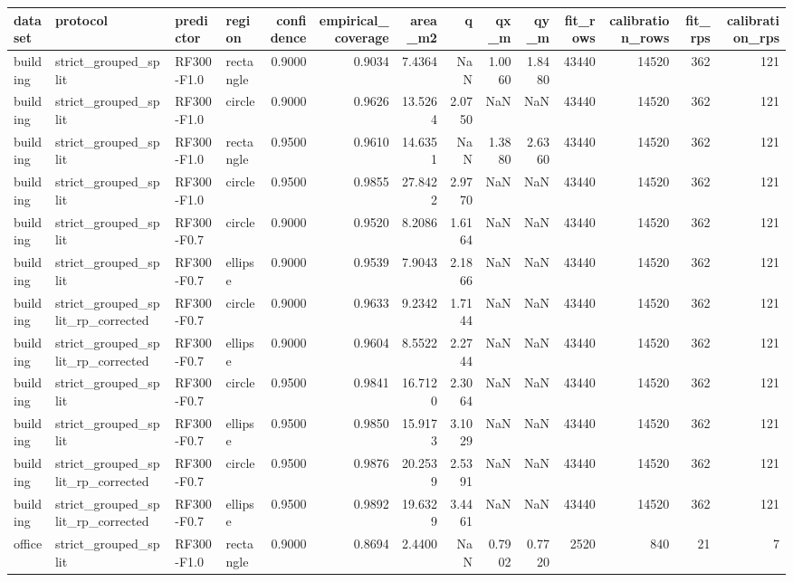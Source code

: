 \begin{tabular}{llllrrrrrrrrrr}
\toprule
dataset & protocol & predictor & region & confidence & empirical\_coverage & area\_m2 & q & qx\_m & qy\_m & fit\_rows & calibration\_rows & fit\_rps & calibration\_rps \\
\midrule
building & strict\_grouped\_split & RF300-F1.0 & rectangle & 0.9000 & 0.9034 & 7.4364 & NaN & 1.0060 & 1.8480 & 43440 & 14520 & 362 & 121 \\
building & strict\_grouped\_split & RF300-F1.0 & circle & 0.9000 & 0.9626 & 13.5264 & 2.0750 & NaN & NaN & 43440 & 14520 & 362 & 121 \\
building & strict\_grouped\_split & RF300-F1.0 & rectangle & 0.9500 & 0.9610 & 14.6351 & NaN & 1.3880 & 2.6360 & 43440 & 14520 & 362 & 121 \\
building & strict\_grouped\_split & RF300-F1.0 & circle & 0.9500 & 0.9855 & 27.8422 & 2.9770 & NaN & NaN & 43440 & 14520 & 362 & 121 \\
building & strict\_grouped\_split & RF300-F0.7 & circle & 0.9000 & 0.9520 & 8.2086 & 1.6164 & NaN & NaN & 43440 & 14520 & 362 & 121 \\
building & strict\_grouped\_split & RF300-F0.7 & ellipse & 0.9000 & 0.9539 & 7.9043 & 2.1866 & NaN & NaN & 43440 & 14520 & 362 & 121 \\
building & strict\_grouped\_split\_rp\_corrected & RF300-F0.7 & circle & 0.9000 & 0.9633 & 9.2342 & 1.7144 & NaN & NaN & 43440 & 14520 & 362 & 121 \\
building & strict\_grouped\_split\_rp\_corrected & RF300-F0.7 & ellipse & 0.9000 & 0.9604 & 8.5522 & 2.2744 & NaN & NaN & 43440 & 14520 & 362 & 121 \\
building & strict\_grouped\_split & RF300-F0.7 & circle & 0.9500 & 0.9841 & 16.7120 & 2.3064 & NaN & NaN & 43440 & 14520 & 362 & 121 \\
building & strict\_grouped\_split & RF300-F0.7 & ellipse & 0.9500 & 0.9850 & 15.9173 & 3.1029 & NaN & NaN & 43440 & 14520 & 362 & 121 \\
building & strict\_grouped\_split\_rp\_corrected & RF300-F0.7 & circle & 0.9500 & 0.9876 & 20.2539 & 2.5391 & NaN & NaN & 43440 & 14520 & 362 & 121 \\
building & strict\_grouped\_split\_rp\_corrected & RF300-F0.7 & ellipse & 0.9500 & 0.9892 & 19.6329 & 3.4461 & NaN & NaN & 43440 & 14520 & 362 & 121 \\
office & strict\_grouped\_split & RF300-F1.0 & rectangle & 0.9000 & 0.8694 & 2.4400 & NaN & 0.7902 & 0.7720 & 2520 & 840 & 21 & 7 \\

\end{tabular}
